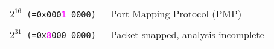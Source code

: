 \documentclass[documentation]{subfiles}
\begin{document}
\begin{longtable}{>{\tt}rl}
        $2^{16}$ (=0x000\textcolor{magenta}{1} 0000) & Port Mapping Protocol (PMP)\\
        \\
        $2^{31}$ (=0x\textcolor{magenta}{8}000 0000) & Packet snapped, analysis incomplete\\
        \bottomrule
    \end{longtable}
\end{document}
